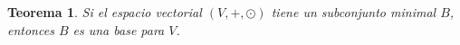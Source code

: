 \documentclass[10pt,a4paper]{report}
\newtheorem{theorem}{Teorema}[chapter]
\newtheorem{lemma}[theorem]{Lema}
\theoremstyle{definition}
\newtheorem{dfn}{Definición}[chapter]
\newtheorem{ejemplo}{Ejemplo}[chapter]
\newtheorem{ejercicio}{Ejercicio}[chapter]
\theoremstyle{remark}
\numberwithin{section}{chapter}
\numberwithin{equation}{chapter}
\numberwithin{tacounter}{chapter}
\begin{document}
\begin{theorem}
Si el espacio vectorial $(V , +, \odot)$ tiene un subconjunto minimal $B$, entonces $B$ es una base para $V$.
\end{theorem}

%
%
%
%
%

\end{document}
